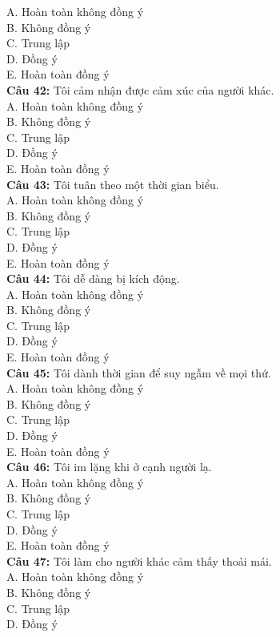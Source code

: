 \begin{multicols}{2}
A. Hoàn toàn không đồng ý \\
B. Không đồng ý \\
C. Trung lập \\
D. Đồng ý \\
E. Hoàn toàn đồng ý \\
\textbf{Câu 42:} Tôi cảm nhận được cảm xúc của người khác. \\
A. Hoàn toàn không đồng ý \\
B. Không đồng ý \\
C. Trung lập \\
D. Đồng ý \\
E. Hoàn toàn đồng ý \\
\textbf{Câu 43:} Tôi tuân theo một thời gian biểu. \\
A. Hoàn toàn không đồng ý \\
B. Không đồng ý \\
C. Trung lập \\
D. Đồng ý \\
E. Hoàn toàn đồng ý \\
\textbf{Câu 44:} Tôi dễ dàng bị kích động. \\
A. Hoàn toàn không đồng ý \\
B. Không đồng ý \\
C. Trung lập \\
D. Đồng ý \\
E. Hoàn toàn đồng ý \\
\textbf{Câu 45:} Tôi dành thời gian để suy ngẫm về mọi thứ. \\
A. Hoàn toàn không đồng ý \\
B. Không đồng ý \\
C. Trung lập \\
D. Đồng ý \\
E. Hoàn toàn đồng ý \\
\textbf{Câu 46:} Tôi im lặng khi ở cạnh người lạ. \\
A. Hoàn toàn không đồng ý \\
B. Không đồng ý \\
C. Trung lập \\
D. Đồng ý \\
E. Hoàn toàn đồng ý \\
\textbf{Câu 47:} Tôi làm cho người khác cảm thấy thoải mái. \\
A. Hoàn toàn không đồng ý \\
B. Không đồng ý \\
C. Trung lập \\
D. Đồng ý \\

\end{multicols}
